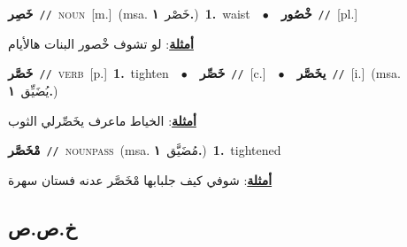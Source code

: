 \documentclass[10pt,a4paper,twoside]{article} %
\begin{document}
\begin{multicols}{2}
{\setlength\topsep{0pt}\textbf{\foreignlanguage{arabic}{خَصِر}}\ {\color{gray}\texttt{//}\color{black}}\ \textsc{noun}\ [m.]\ \color{gray}(msa. \foreignlanguage{arabic}{خَصْر}~\foreignlanguage{arabic}{\textbf{١.}})\color{black}\ \textbf{1.}~waist\ \ $\bullet$\ \ \setlength\topsep{0pt}\textbf{\foreignlanguage{arabic}{خْصُور}}\ {\color{gray}\texttt{//}\color{black}}\ [pl.]\  \begin{flushright}\color{gray}\foreignlanguage{arabic}{\textbf{\underline{\foreignlanguage{arabic}{أمثلة}}}: لو تشوف خْصور البنات هالأيام}\end{flushright}\color{black}} \vspace{2mm}

{\setlength\topsep{0pt}\textbf{\foreignlanguage{arabic}{خَصَّر}}\ {\color{gray}\texttt{//}\color{black}}\ \textsc{verb}\ [p.]\ \textbf{1.}~tighten\ \ $\bullet$\ \ \setlength\topsep{0pt}\textbf{\foreignlanguage{arabic}{خَصِّر}}\ {\color{gray}\texttt{//}\color{black}}\ [c.]\ \ $\bullet$\ \ \setlength\topsep{0pt}\textbf{\foreignlanguage{arabic}{يخَصَّر}}\ {\color{gray}\texttt{//}\color{black}}\ [i.]\ \color{gray}(msa. \foreignlanguage{arabic}{يُضَيِّق}~\foreignlanguage{arabic}{\textbf{١.}})\color{black}\  \begin{flushright}\color{gray}\foreignlanguage{arabic}{\textbf{\underline{\foreignlanguage{arabic}{أمثلة}}}: الخياط ماعرف يخَصِّرلي الثوب}\end{flushright}\color{black}} \vspace{2mm}

{\setlength\topsep{0pt}\textbf{\foreignlanguage{arabic}{مْخَصَّر}}\ {\color{gray}\texttt{//}\color{black}}\ \textsc{noun\textunderscore pass}\ \color{gray}(msa. \foreignlanguage{arabic}{مُضَيَّق}~\foreignlanguage{arabic}{\textbf{١.}})\color{black}\ \textbf{1.}~tightened\  \begin{flushright}\color{gray}\foreignlanguage{arabic}{\textbf{\underline{\foreignlanguage{arabic}{أمثلة}}}: شوفي كيف جلبابها مْخَصَّر عدنه فستان سهرة}\end{flushright}\color{black}} \vspace{2mm}

\vspace{-3mm}
\subsection*{\color{blue}\foreignlanguage{arabic}{خ.ص.ص}\color{blue}{}} 


\end{multicols}
\end{document}
